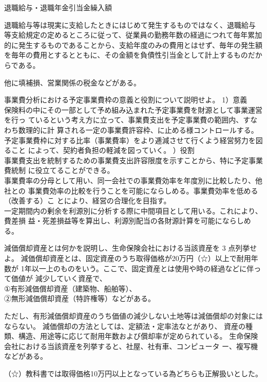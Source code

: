 \documentclass[report,gutter=10mm,fore-edge=10mm,uplatex,dvipdfmx]{jlreq}
\begin{document}
\noindent 退職給与・退職年金引当金繰入額

退職給与等は現実に支給したときにはじめて発生するものではなく、退職給与
等支給規定の定めるところに従って、従業員の勤務年数の経過につれて毎年累加
的に発生するものであることから、支給年度のみの費用とはせず、毎年の発生額
を毎年の費用とするとともに、その金額を負債性引当金として計上するものだか
らである。

他に填補損、営業関係の税金などがある。

事業費分析における予定事業費枠の意義と役割について説明せよ。
\answer{}
\noindent{} 1）意義\\
保険料の中にその一部として予め組み込まれた予定事業費を財源として事業運営を行っ
ているという考え方に立って、事業費支出を予定事業費の範囲内、すなわち数理的に計
算される一定の事業費許容枠、に止める様コントロールする。\\
予定事業費枠に対する比率（事業費率）をより逓減させて行くよう経営努力を図ること
によって、契約者負担の軽減を図っていく。
）役割\\
事業費支出を統制するための事業費支出許容限度を示すことから、特に予定事業費統制
に役立てることができる。\\
事業費率の分母として用い、同一会社での事業費効率を年度別に比較したり、他社との
事業費効率の比較を行うことを可能にならしめる。事業費効率を低める（改善する）こ
とにより、経営の合理化を目指す。\\
一定期間内の剰余を利源別に分析する際に中間項目として用いる。これにより、費差損
益・死差損益等を算出し、利源別配当の各財源計算を可能にならしめる。

減価償却資産とは何かを説明し、生命保険会社における当該資産を 3 点列挙せよ。
\answer{}
減価償却資産とは、固定資産のうち取得価格が20万円（☆）以上で耐用年数が
1年以一上のものをいう。ここで、固定資産とは使用や時の経過などに伴って価値が
減少していく資産で、\\
①有形減価償却資産（建築物、船舶等）、\\
②無形減価償却資産（特許権等）などがある。

ただし、有形減価償却資産のうち価値の減少しない土地等は減価償却の対象にはならない。
減価償却の方法としては、定額法・定率法なとがあり、
資産の種類、構造、用途等に応じて耐用年数および償却率が定められている。
生命保険会社における当該資産を列挙すると、社屋、社有車、コンピュータ
ー、複写機などがある。

（☆）教科書では取得価格10万円以上となっている為どちらも正解扱いとした。
\end{document}
